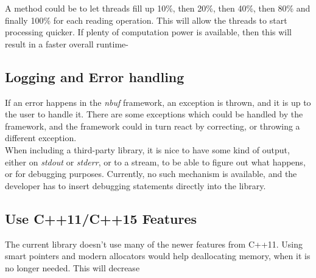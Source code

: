 \documentclass[a4paper]{article}
\newcommand{\nbuf}{\textit{nbuf} }
\begin{document}
A method could be to let threads fill up 10\%, then 20\%, then 40\%, then 80\% and finally 100\% for each reading operation. This will allow the threads to start processing quicker. If plenty of computation power is available, then this will result in a faster overall runtime-


\subsection{Logging and Error handling}
If an error happens in the \nbuf framework, an exception is thrown, and it is up to the user to handle it. There are some exceptions which could be handled by the framework, and the framework could in turn react by correcting, or throwing a different exception.\\

When including a third-party library, it is nice to have some kind of output, either on \textit{stdout} or \textit{stderr}, or to a stream, to be able to figure out what happens, or for debugging purposes. Currently, no such mechanism is available, and the developer has to insert debugging statements directly into the library.


\subsection{Use C++11/C++15 Features}
The current library doesn't use many of the newer features from C++11. Using smart pointers and modern allocators would help deallocating memory, when it is no longer needed. This will decrease 


\newpage


\end{document}
